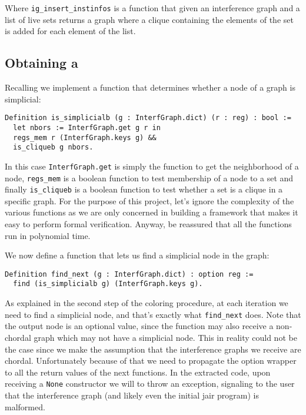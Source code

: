Where \texttt{ig\_insert\_instinfos} is a function that given an interference graph and a list of live sets returns a graph where a clique containing the elements of the set is added for each element of the list.

\subsection{Obtaining a }
\label{subsec:peo}

Recalling  we implement a function that determines whether a node of a graph is simplicial:

\begin{lstlisting}[style=Rocq]
Definition is_simplicialb (g : InterfGraph.dict) (r : reg) : bool :=
  let nbors := InterfGraph.get g r in
  regs_mem r (InterfGraph.keys g) &&
  is_cliqueb g nbors.
\end{lstlisting}

In this case \texttt{InterfGraph.get} is simply the function to get the neighborhood of a node, \texttt{regs\_mem} is a boolean function to test membership of a node to a set and finally \texttt{is\_cliqueb} is a boolean function to test whether a set is a clique in a specific graph.
For the purpose of this project, let's ignore the complexity of the various functions as we are only concerned in building a framework that makes it easy to perform formal verification. Anyway, be reassured that all the functions run in polynomial time.

We now define a function that lets us find a simplicial node in the graph:

\begin{lstlisting}[style=Rocq]
Definition find_next (g : InterfGraph.dict) : option reg :=
  find (is_simplicialb g) (InterfGraph.keys g).
\end{lstlisting}

As explained in the second step of the coloring procedure, at each iteration we need to find a simplicial node, and that's exactly what \texttt{find\_next} does. Note that the output node is an optional value, since the function may also receive a non-chordal graph which may not have a simplicial node. This in reality could not be the case since we make the assumption that the interference graphs we receive are chordal. Unfortunately because of that we need to propagate the option wrapper to all the return values of the next functions.
In the extracted code, upon receiving a \texttt{None} constructor we will to throw an exception, signaling to the user that the interference graph (and likely even the initial \gls{jair} program) is malformed.

